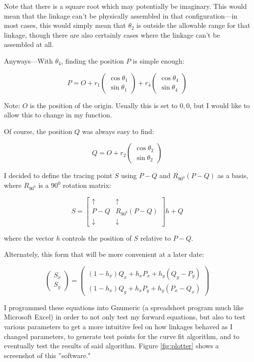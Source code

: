 \documentclass[12pt, letterpaper]{article}
\begin{document}
Note that there is a square root which may potentially be imaginary.  This would mean that the linkage can't be physically assembled in that configuration---in most cases, this would simply mean that \(\theta_2\) is outside the allowable range for that linkage, though there are also certainly cases where the linkage can't be assembled at all.

Anyways---With \(\theta_4\), finding the position \(P\) is simple enough:

\[P=O+r_1\begin{pmatrix}\cos\theta_1\\ \sin\theta_1\end{pmatrix}+
r_4\begin{pmatrix}\cos\theta_4\\ \sin\theta_4\end{pmatrix}\]

Note: \(O\) is the position of the origin. Usually this is set to \(0,0\), but I would like to allow this to change in my function.

Of course, the position \(Q\) was always easy to find:

\[Q=O+r_2\begin{pmatrix}\cos\theta_2\\ \sin\theta_2\end{pmatrix}\]

I decided to define the tracing point \(S\) using \(P-Q\) and \(R_{90^0}\left(P-Q\right)\) as a basis, where \(R_{90^0}\) is a \(90^0\) rotation matrix:

\[S=\begin{bmatrix}
\uparrow & \uparrow\\
P-Q & R_{90^0}\left(P-Q\right)\\
\downarrow & \downarrow
\end{bmatrix}
h
+Q\]

where the vector \(h\) controls the position of \(S\) relative to \(P-Q\).

Alternately, this form that will be more convenient at a later date:

\[\begin{pmatrix}S_x\\S_y\end{pmatrix}=
\begin{pmatrix}(1-h_x)Q_x+h_xP_x+h_y\left(Q_y-P_y\right)\\
(1-h_x)Q_y+h_xP_y+h_y\left(P_x-Q_x\right)\end{pmatrix}\]

I programmed these equations into Gnumeric (a spreadsheet program much like Microsoft Excel) in order to not only test my forward equations, but also to test various parameters to get a more intuitive feel on how linkages behaved as I changed parameters, to generate test points for the curve fit algorithm, and to eventually test the results of said algorithm. Figure \ref{fig:plotter} shows a screenshot of this ''software."
\end{document}
